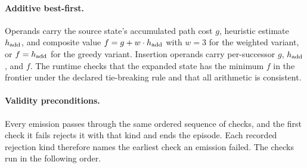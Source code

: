 \paragraph{Additive best-first.}
Operands carry the source state's accumulated path cost $g$, heuristic estimate $h_{\rm add}$, and composite value $f = g + w \cdot h_{\rm add}$ with $w = 3$ for the weighted variant, or $f = h_{\rm add}$ for the greedy variant. Insertion operands carry per-successor $g$, $h_{\rm add}$, and $f$. The runtime checks that the expanded state has the minimum $f$ in the frontier under the declared tie-breaking rule and that all arithmetic is consistent.

\paragraph{Validity preconditions.}
Every emission passes through the same ordered sequence of checks, and the first check it fails rejects it with that kind and ends the episode. Each recorded rejection kind therefore names the earliest check an emission failed. The checks run in the following order.

